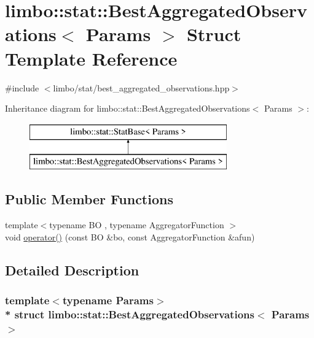\hypertarget{structlimbo_1_1stat_1_1_best_aggregated_observations}{}\section{limbo\+:\+:stat\+:\+:Best\+Aggregated\+Observations$<$ Params $>$ Struct Template Reference}
\label{structlimbo_1_1stat_1_1_best_aggregated_observations}


{\ttfamily \#include $<$limbo/stat/best\+\_\+aggregated\+\_\+observations.\+hpp$>$}

Inheritance diagram for limbo\+:\+:stat\+:\+:Best\+Aggregated\+Observations$<$ Params $>$\+:\begin{figure}[H]
\begin{center}
\leavevmode
\includegraphics[height=2.000000cm]{structlimbo_1_1stat_1_1_best_aggregated_observations}
\end{center}
\end{figure}
\subsection*{Public Member Functions}
\begin{DoxyCompactItemize}
\item 
{\footnotesize template$<$typename BO , typename Aggregator\+Function $>$ }\\void \hyperlink{structlimbo_1_1stat_1_1_best_aggregated_observations_a37ad22cd25f49bbec5109a6f1367057e}{operator()} (const BO \&bo, const Aggregator\+Function \&afun)
\end{DoxyCompactItemize}


\subsection{Detailed Description}
\subsubsection*{template$<$typename Params$>$\\*
struct limbo\+::stat\+::\+Best\+Aggregated\+Observations$<$ Params $>$}

